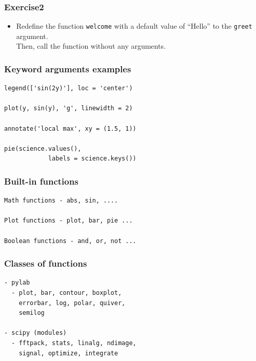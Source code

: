 \documentclass[17pt]{beamer}
\begin{document}
\begin{frame}
\frametitle{Exercise2}
\label{sec-8}

\begin{itemize}
\item Redefine the function \texttt{welcome} with a default value of
  ``Hello'' to the \texttt{greet} argument.\\ 
  Then, call the function without any arguments.
\end{itemize}
\end{frame}

\begin{frame}[fragile]
\frametitle{Keyword arguments examples}
\label{sec-9}

\lstset{language=Python}
\begin{small}
\begin{lstlisting}
legend(['sin(2y)'], loc = 'center')

plot(y, sin(y), 'g', linewidth = 2)

annotate('local max', xy = (1.5, 1))

pie(science.values(),      
            labels = science.keys())
\end{lstlisting}
\end{small}
\end{frame}

\begin{frame}[fragile]
\frametitle{Built-in functions}
\label{sec-10}

\lstset{language=Python}
\begin{small}
\begin{lstlisting}
Math functions - abs, sin, ....
 
Plot functions - plot, bar, pie ...
 
Boolean functions - and, or, not ...
\end{lstlisting}
\end{small}
\end{frame}

\begin{frame}[fragile]
\frametitle{Classes of functions}
\label{sec-11}

\lstset{language=Python}
\begin{small}
\begin{lstlisting}
- pylab
  - plot, bar, contour, boxplot, 
    errorbar, log, polar, quiver, 
    semilog

- scipy (modules)
  - fftpack, stats, linalg, ndimage, 
    signal, optimize, integrate
\end{lstlisting}
\end{small}
\end{frame}
\end{document}
